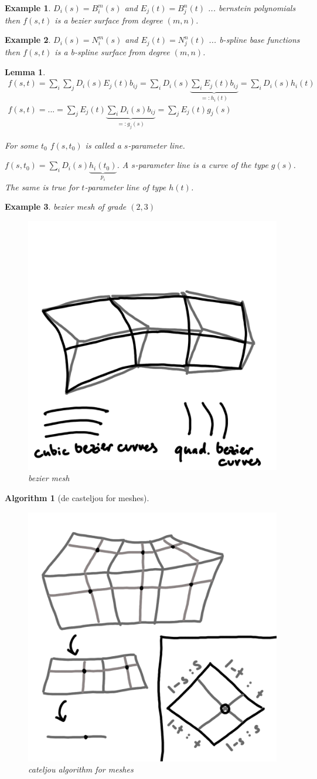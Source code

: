 \documentclass[]{article}
\newtheorem{lemma}{Lemma}
\newtheorem{algorithm}{Algorithm}
\newtheorem{example}{Example}
\begin{document}
\begin{example}
	$D_i(s) = B_i^m(s)$ and $E_j(t)=B_j^n(t)$ ... bernstein polynomials then $f(s,t)$ is a bezier surface from degree $(m,n)$.
\end{example}

\begin{example}
	$D_i(s) = N_i^m(s)$ and $E_j(t)=N_j^n(t)$ ... b-spline base functions then $f(s,t)$ is a b-spline surface from degree $(m,n)$.
\end{example}

\begin{lemma}
	\begin{align*}
		f(s,t) = \sum_i \sum_j D_i(s) E_j(t) b_{ij} = \sum_i D_i(s) \underbrace{\sum_i E_j(t) b_{ij}}_{=: h_i(t)} = \sum_i D_i(s)h_i(t)\\
		f(s,t) = ... = \sum_j E_j(t) \underbrace{\sum_i D_i(s) b_{ij}}_{=: g_j(s)} = \sum_j E_j(t) g_j(s)
	\end{align*}
	
	For some $t_0$ $f(s,t_0)$ is called a $s$-parameter line.
	
	$f(s,t_0) = \sum_i D_i(s)\underbrace{h_i(t_0)}_{p_i}$. A $s$-parameter line is a curve of the type $g(s)$. The same is true for $t$-parameter line of type $h(t)$.
\end{lemma}

\begin{example}
	bezier mesh of grade $(2,3)$
	
	\begin{figure}[h!]
		\centering
		\includegraphics[width=0.3\linewidth]{figures/bezier_mesh}
		\caption{bezier mesh}
		\label{fig:bezier_mesh}
	\end{figure}
\end{example}

\begin{algorithm}[de casteljou for meshes]
	\begin{figure}[h!]
		\centering
		\includegraphics[width=0.3\linewidth]{figures/decasteljou_mesh}
		\caption{cateljou algorithm for meshes}
		\label{fig:decasteljou_mesh}
	\end{figure}
\end{algorithm}
\end{document}
